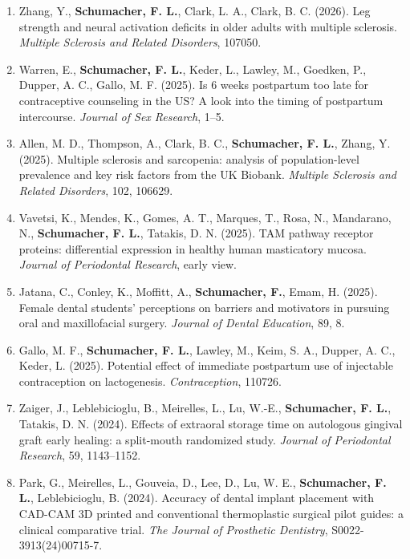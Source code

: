 \documentclass[
  10pt,
  letterpaper,
]{article}
\providecommand{\tightlist}{%
  \setlength{\itemsep}{0pt}\setlength{\parskip}{0pt}}
\begin{document}
\begin{enumerate}
\def\labelenumi{\arabic{enumi}.}
\tightlist
\item
  Zhang, Y., \textbf{Schumacher, F. L.}, Clark, L. A., Clark, B. C.
  (2026). Leg strength and neural activation deficits in older adults
  with multiple sclerosis. \emph{Multiple Sclerosis and Related
  Disorders}, 107050.
\item
  Warren, E., \textbf{Schumacher, F. L.}, Keder, L., Lawley, M.,
  Goedken, P., Dupper, A. C., Gallo, M. F. (2025). Is 6 weeks postpartum
  too late for contraceptive counseling in the US? A look into the
  timing of postpartum intercourse. \emph{Journal of Sex Research},
  1--5.
\item
  Allen, M. D., Thompson, A., Clark, B. C., \textbf{Schumacher, F. L.},
  Zhang, Y. (2025). Multiple sclerosis and sarcopenia: analysis of
  population-level prevalence and key risk factors from the UK Biobank.
  \emph{Multiple Sclerosis and Related Disorders}, 102, 106629.
\item
  Vavetsi, K., Mendes, K., Gomes, A. T., Marques, T., Rosa, N.,
  Mandarano, N., \textbf{Schumacher, F. L.}, Tatakis, D. N. (2025). TAM
  pathway receptor proteins: differential expression in healthy human
  masticatory mucosa. \emph{Journal of Periodontal Research}, early
  view.
\item
  Jatana, C., Conley, K., Moffitt, A., \textbf{Schumacher, F.}, Emam, H.
  (2025). Female dental students' perceptions on barriers and motivators
  in pursuing oral and maxillofacial surgery. \emph{Journal of Dental
  Education}, 89, 8.
\item
  Gallo, M. F., \textbf{Schumacher, F. L.}, Lawley, M., Keim, S. A.,
  Dupper, A. C., Keder, L. (2025). Potential effect of immediate
  postpartum use of injectable contraception on lactogenesis.
  \emph{Contraception}, 110726.
\item
  Zaiger, J., Leblebicioglu, B., Meirelles, L., Lu, W.-E.,
  \textbf{Schumacher, F. L.}, Tatakis, D. N. (2024). Effects of
  extraoral storage time on autologous gingival graft early healing: a
  split-mouth randomized study. \emph{Journal of Periodontal Research},
  59, 1143--1152.
\item
  Park, G., Meirelles, L., Gouveia, D., Lee, D., Lu, W. E.,
  \textbf{Schumacher, F. L.}, Leblebicioglu, B. (2024). Accuracy of
  dental implant placement with CAD-CAM 3D printed and conventional
  thermoplastic surgical pilot guides: a clinical comparative trial.
  \emph{The Journal of Prosthetic Dentistry}, S0022-3913(24)00715-7.

\end{enumerate}
\end{document}
